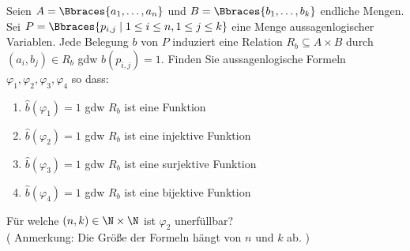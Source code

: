 
\begin{exercise}[48]

Seien $A = \Bbraces{a_1, \dots, a_n}$ und $B = \Bbraces{b_1, \dots, b_k}$ endliche Mengen.
Sei $P = \Bbraces{p_{i, j} \mid 1 \leq i \leq n, 1 \leq j \leq k}$ eine Menge aussagenlogischer Variablen.
Jede Belegung $b$ von $P$ induziert eine Relation $R_b \subseteq A \times B$ durch $(a_i, b_j) \in R_b$ gdw $b(p_{i, j}) = 1$.
Finden Sie aussagenlogische Formeln $\varphi_1, \varphi_2, \varphi_3, \varphi_4$ so dass:

\begin{enumerate}[label = \arabic*.]
    \item $\hat{b}(\varphi_1) = 1$ gdw $R_b$ ist eine Funktion
    \item $\hat{b}(\varphi_2) = 1$ gdw $R_b$ ist eine injektive Funktion
    \item $\hat{b}(\varphi_3) = 1$ gdw $R_b$ ist eine surjektive Funktion
    \item $\hat{b}(\varphi_4) = 1$ gdw $R_b$ ist eine bijektive Funktion
\end{enumerate}

Für welche $(n, k) \in \N \times \N$ ist $\varphi_2$ unerfüllbar? \\

(
    Anmerkung:
    Die Größe der Formeln hängt von $n$ und $k$ ab.
)

\end{exercise}


